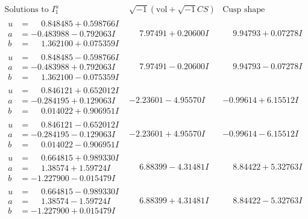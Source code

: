 \documentclass[1p]{elsarticle_modified}
\theoremstyle{definition}
\newcommand{\I}{\sqrt{-1}}
\begin{document}
$$\begin{array}{c|c|c}  
\text{Solutions to }I^u_{1}& \I (\text{vol} + \sqrt{-1}CS) & \text{Cusp shape}\\
 \hline 
\begin{aligned}
u &= \phantom{-}0.848485 + 0.598766 I \\
a &= -0.483988 - 0.792063 I \\
b &= \phantom{-}1.362100 + 0.075359 I\end{aligned}
 & \phantom{-}7.97491 + 0.20600 I & \phantom{-}9.94793 + 0.07278 I \\ \hline\begin{aligned}
u &= \phantom{-}0.848485 - 0.598766 I \\
a &= -0.483988 + 0.792063 I \\
b &= \phantom{-}1.362100 - 0.075359 I\end{aligned}
 & \phantom{-}7.97491 - 0.20600 I & \phantom{-}9.94793 - 0.07278 I \\ \hline\begin{aligned}
u &= \phantom{-}0.846121 + 0.652012 I \\
a &= -0.284195 + 0.129063 I \\
b &= \phantom{-}0.014022 + 0.906951 I\end{aligned}
 & -2.23601 - 4.95570 I & -0.99614 + 6.15512 I \\ \hline\begin{aligned}
u &= \phantom{-}0.846121 - 0.652012 I \\
a &= -0.284195 - 0.129063 I \\
b &= \phantom{-}0.014022 - 0.906951 I\end{aligned}
 & -2.23601 + 4.95570 I & -0.99614 - 6.15512 I \\ \hline\begin{aligned}
u &= \phantom{-}0.664815 + 0.989330 I \\
a &= \phantom{-}1.38574 + 1.59724 I \\
b &= -1.227900 - 0.015479 I\end{aligned}
 & \phantom{-}6.88399 - 4.31481 I & \phantom{-}8.84422 + 5.32763 I \\ \hline\begin{aligned}
u &= \phantom{-}0.664815 - 0.989330 I \\
a &= \phantom{-}1.38574 - 1.59724 I \\
b &= -1.227900 + 0.015479 I\end{aligned}
 & \phantom{-}6.88399 + 4.31481 I & \phantom{-}8.84422 - 5.32763 I \\ \hline\begin{aligned}

\end{aligned}
\end{array}$$
\end{document}
